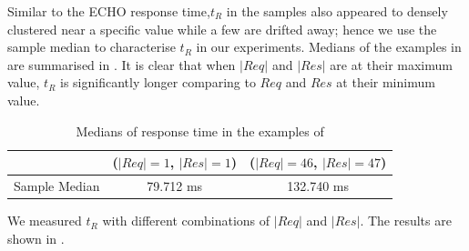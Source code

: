 Similar to the ECHO response time,$t_R$ in the samples also appeared to densely clustered near a specific value while a few are drifted away; hence we use the sample median to characterise $t_R$ in our experiments. Medians of the examples in  are summarised in . It is clear that when $|Req|$ and $|Res|$ are at their maximum value, $t_R$ is significantly longer comparing to $Req$ and $Res$ at their minimum value.
 
\begin{table}
	\center
	\begin{tabular}{|c|c|c|}
		\hline
		 				&($|Req| = 1$, $|Res| = 1$) 	& ($|Req| = 46$, $|Res| = 47$) 	\\ \hline
		 Sample Median	&79.712 ms                  			& 132.740 ms                   			\\ \hline
	\end{tabular}

	\caption{Medians of response time in the examples of }
	\label{Tbl: Median of response times in examples}
\end{table}

We measured $t_R$ with different combinations of $|Req|$ and $|Res|$. The results are shown in .

